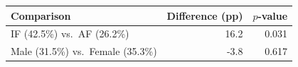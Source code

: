 \begin{tabular}{lrr}
  \toprule
  Comparison & Difference (pp) & $p$-value \\ 
  \midrule
  IF (42.5\%) vs.\ AF (26.2\%) & 16.2 & 0.031 \\ 
  Male (31.5\%) vs.\ Female (35.3\%) & -3.8 & 0.617 \\ 
  \bottomrule
\end{tabular}
